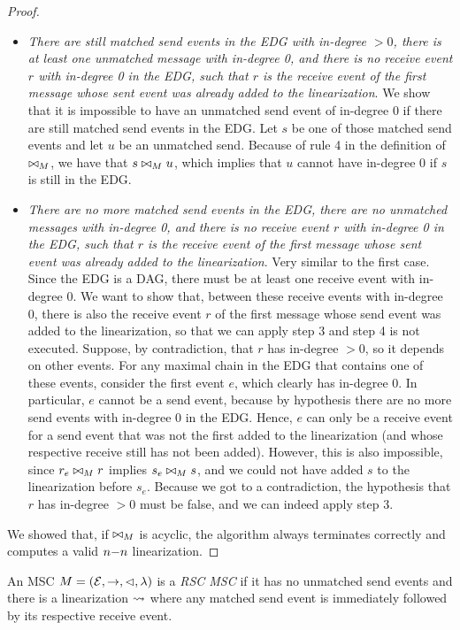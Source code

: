 \begin{proof}
\begin{itemize}
	\item \emph{There are still matched send events in the EDG with in-degree $>0$, there is at least one unmatched message with in-degree 0, and there is no receive event $r$ with in-degree 0 in the EDG, such that $r$ is the receive event of the first message whose sent event was already added to the linearization}. We show that it is impossible to have an unmatched send event of in-degree 0 if there are still matched send events in the EDG. Let $s$ be one of those matched send events and let $u$ be an unmatched send. Because of rule 4 in the definition of $\bowtie_M$, we have that $s \bowtie_M u$, which implies that $u$ cannot have in-degree 0 if $s$ is still in the EDG.
	\item \emph{There are no more matched send events in the EDG, there are no unmatched messages with in-degree 0, and there is no receive event $r$ with in-degree 0 in the EDG, such that $r$ is the receive event of the first message whose sent event was already added to the linearization}. Very similar to the first case. Since the EDG is a DAG, there must be at least one receive event with in-degree 0. We want to show that, between these receive events with in-degree 0, there is also the receive event $r$ of the first message whose send event was added to the linearization, so that we can apply step 3 and step 4 is not executed. Suppose, by contradiction, that $r$ has in-degree $>0$, so it depends on other events. For any maximal chain in the EDG that contains one of these events, consider the first event $e$, which clearly has in-degree 0. In particular, $e$ cannot be a send event, because by hypothesis there are no more send events with in-degree 0 in the EDG. Hence, $e$ can only be a receive event for a send event that was not the first added to the linearization (and whose respective receive still has not been added). However, this is also impossible, since $r_e \bowtie_M r$ implies $s_e \bowtie_M s$, and we could not have added $s$ to the linearization before $s_e$. Because we got to a contradiction, the hypothesis that $r$ has in-degree $>0$ must be false, and we can indeed apply step 3.
\end{itemize}
We showed that, if $\bowtie_M$ is acyclic, the algorithm always terminates correctly and computes a valid $n\mathsf{-}n$ linearization.
\end{proof}

\begin{definition}%
	An MSC $M = (\mathcal{E},\to,\lhd,\lambda)$ is a \emph{RSC MSC} if it has no unmatched send events and there is a linearization $\rightsquigarrow$ where any matched send event is immediately followed by its respective receive event.
\end{definition}

